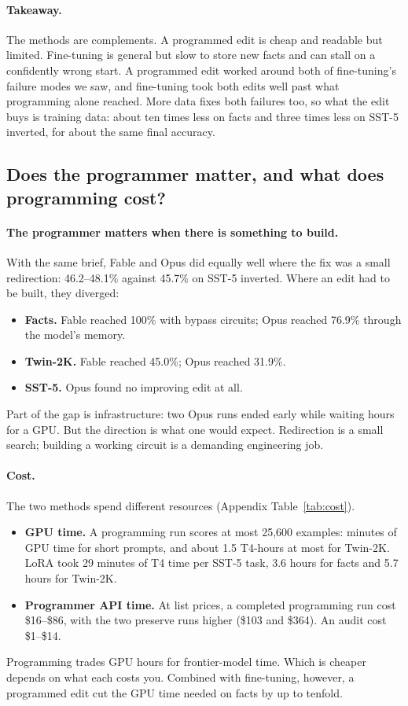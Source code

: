 \paragraph{Takeaway.} The methods are complements. A programmed edit is cheap and readable but limited. Fine-tuning is general but slow to store new facts and can stall on a confidently wrong start. A programmed edit worked around both of fine-tuning's failure modes we saw, and fine-tuning took both edits well past what programming alone reached. More data fixes both failures too, so what the edit buys is training data: about ten times less on facts and three times less on SST-5 inverted, for about the same final accuracy.

\subsection{Does the programmer matter, and what does programming cost?}
\label{sec:programmer}
\paragraph{The programmer matters when there is something to build.} With the same brief, Fable and Opus did equally well where the fix was a small redirection: 46.2--48.1\% against 45.7\% on SST-5 inverted. Where an edit had to be built, they diverged:
\begin{itemize}
  \item \textbf{Facts.} Fable reached 100\% with bypass circuits; Opus reached 76.9\% through the model's memory.
  \item \textbf{Twin-2K.} Fable reached 45.0\%; Opus reached 31.9\%.
  \item \textbf{SST-5.} Opus found no improving edit at all.
\end{itemize}
Part of the gap is infrastructure: two Opus runs ended early while waiting hours for a GPU. But the direction is what one would expect. Redirection is a small search; building a working circuit is a demanding engineering job.

\paragraph{Cost.} The two methods spend different resources (Appendix Table~\ref{tab:cost}).
\begin{itemize}
  \item \textbf{GPU time.} A programming run scores at most 25,600 examples: minutes of GPU time for short prompts, and about 1.5 T4-hours at most for Twin-2K. LoRA took 29 minutes of T4 time per SST-5 task, 3.6 hours for facts and 5.7 hours for Twin-2K.
  \item \textbf{Programmer API time.} At list prices, a completed programming run cost \$16--\$86, with the two preserve runs higher (\$103 and \$364). An audit cost \$1--\$14.
\end{itemize}
Programming trades GPU hours for frontier-model time. Which is cheaper depends on what each costs you. Combined with fine-tuning, however, a programmed edit cut the GPU time needed on facts by up to tenfold.
